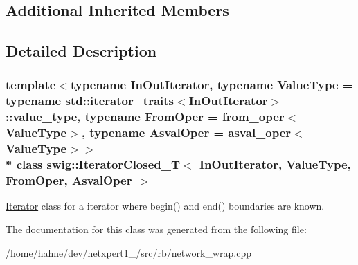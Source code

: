 \subsection*{Additional Inherited Members}


\subsection{Detailed Description}
\subsubsection*{template$<$typename In\+Out\+Iterator, typename Value\+Type = typename std\+::iterator\+\_\+traits$<$\+In\+Out\+Iterator$>$\+::value\+\_\+type, typename From\+Oper = from\+\_\+oper$<$\+Value\+Type$>$, typename Asval\+Oper = asval\+\_\+oper$<$\+Value\+Type$>$$>$\\*
class swig\+::\+Iterator\+Closed\+\_\+\+T$<$ In\+Out\+Iterator, Value\+Type, From\+Oper, Asval\+Oper $>$}

\hyperlink{structswig_1_1Iterator}{Iterator} class for a iterator where begin() and end() boundaries are known. 

The documentation for this class was generated from the following file\+:\begin{DoxyCompactItemize}
\item 
/home/hahne/dev/netxpert1\+\_/src/rb/network\+\_\+wrap.\+cpp\end{DoxyCompactItemize}
